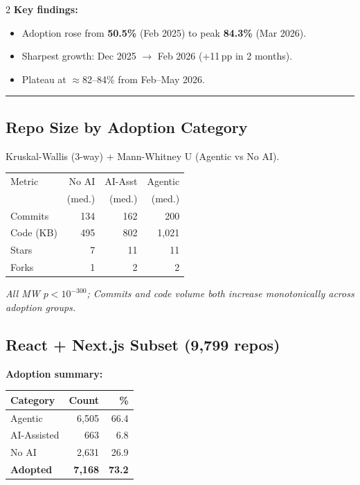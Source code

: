 \documentclass[10pt,a4paper]{article}
\begin{document}
\begin{multicols}{2}
\vspace{3pt}
\textbf{Key findings:}
\begin{itemize}\setlength\itemsep{0pt}
  \item Adoption rose from \textbf{50.5\%} (Feb 2025)
        to peak \textbf{84.3\%} (Mar 2026).
  \item Sharpest growth: Dec 2025 $\to$ Feb 2026
        (+11\,pp in 2 months).
  \item Plateau at $\approx$82--84\% from Feb--May 2026.
\end{itemize}

\vspace{3pt}
\hrule
\vspace{3pt}

\subsection*{Repo Size by Adoption Category}
Kruskal-Wallis (3-way) + Mann-Whitney U (Agentic vs No AI).

\vspace{2pt}
\begin{tabular}{@{}lrrr@{}}
\toprule
Metric & No AI & AI-Asst & Agentic \\
       & (med.)& (med.)  & (med.)  \\
\midrule
Commits   & 134 & 162 & 200 \\
Code (KB) & 495 & 802 & 1{,}021 \\
\midrule
Stars     &   7 &  11 &   11 \\
Forks     &   1 &   2 &    2 \\
\bottomrule
\end{tabular}

\vspace{2pt}
\textit{All MW $p < 10^{-300}$;\;
Commits and code volume both increase monotonically across adoption groups.}

\columnbreak

\subsection*{React + Next.js Subset (9,799 repos)}

\textbf{Adoption summary:}

\vspace{2pt}
\begin{tabular}{@{}lrr@{}}
\toprule
Category & Count & \% \\
\midrule
Agentic         & 6,505 & 66.4 \\
AI-Assisted     &   663 &  6.8 \\
No AI           & 2,631 & 26.9 \\
\midrule
\textbf{Adopted}& \textbf{7,168} & \textbf{73.2} \\
\bottomrule
\end{tabular}


\end{multicols}
\end{document}
